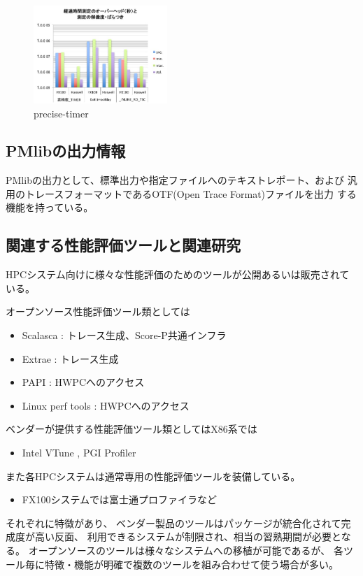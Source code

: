 \documentclass[submit,techrep,noauthor]{ipsj}
\begin{document}
\begin{figure}[tb]
\centering\includegraphics[width=0.45\textwidth]{figs/precise-timer.jpg}
\caption{precise-timer}
\label{fig:precise-timer}
\end{figure}



\subsection{PMlibの出力情報}
PMlibの出力として、標準出力や指定ファイルへのテキストレポート、および
汎用のトレースフォーマットであるOTF(Open Trace Format)ファイルを出力
する機能を持っている。


\subsection{関連する性能評価ツールと関連研究}

HPCシステム向けに様々な性能評価のためのツールが公開あるいは販売されている。\par
オープンソース性能評価ツール類としては
\begin{itemize}
	\item Scalasca \cite{Scalasca:2017} : トレース生成、Score-P共通インフラ
	\item Extrae \cite{Extrae:webpage} : トレース生成
	\item PAPI \cite{PAPI:5.6} : HWPCへのアクセス
	\item Linux perf tools : HWPCへのアクセス
\end{itemize}
ベンダーが提供する性能評価ツール類としてはX86系では 
\begin{itemize}
		\item Intel VTune \cite{Intel:VTune}, PGI Profiler \cite{PGI:Profiler}
\end{itemize}
また各HPCシステムは通常専用の性能評価ツールを装備している。
\begin{itemize}
	\item FX100システムでは富士通プロファイラなど
\end{itemize}
それぞれに特徴があり、
ベンダー製品のツールはパッケージが統合化されて完成度が高い反面、
利用できるシステムが制限され、相当の習熟期間が必要となる。
オープンソースのツールは様々なシステムへの移植が可能であるが、
各ツール毎に特徴・機能が明確で複数のツールを組み合わせて使う場合が多い。
\end{document}
